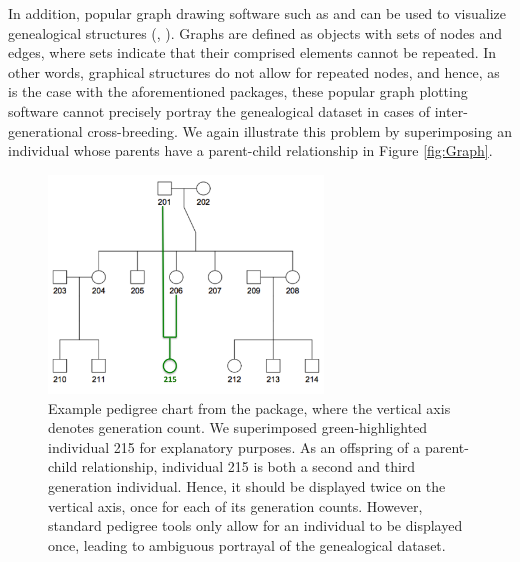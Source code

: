 \documentclass[article,shortnames]{jss}
\begin{document}
In addition, popular graph drawing software such as  and  can be used to visualize genealogical structures (\citealt{graphvizCit}, \citealt{cytoscapeCit}). Graphs are defined as objects with sets of nodes and edges, where sets indicate that their comprised elements cannot be repeated. In other words, graphical structures do not allow for repeated nodes, and hence, as is the case with the aforementioned  packages, these popular graph plotting software cannot precisely portray the genealogical dataset in cases of inter-generational cross-breeding. We again illustrate this problem by superimposing an individual whose parents have a parent-child relationship in Figure \ref{fig:Graph}.

\begin{figure}[h]
    \centering
    \includegraphics[width=0.65\textwidth]{kinshipFig}
    \caption{Example pedigree chart from the  package, where the vertical axis denotes generation count. We superimposed green-highlighted individual 215 for explanatory purposes. As an offspring of a parent-child relationship, individual 215 is both a second and third generation individual. Hence, it should be displayed twice on the vertical axis, once for each of its generation counts. However, standard pedigree tools only allow for an individual to be displayed once, leading to ambiguous portrayal of the genealogical dataset.}
    \label{fig:kinshipFig}
\end{figure}
\end{document}
